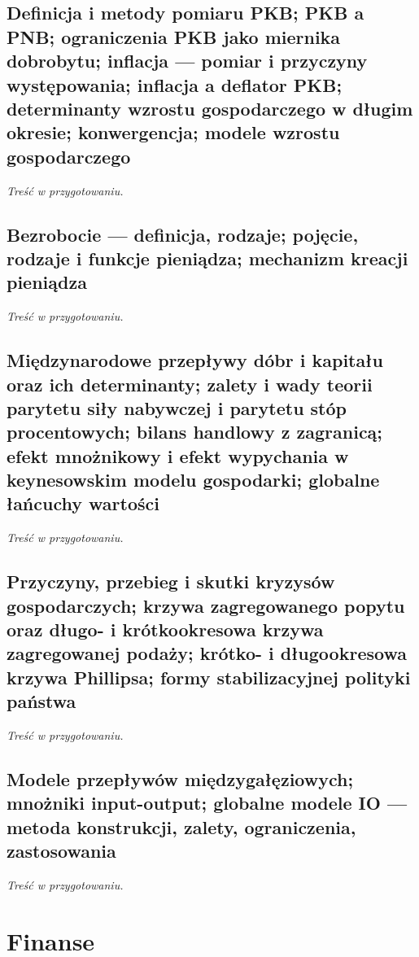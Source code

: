 \documentclass[12pt,a4paper]{report}
\begin{document}
\section[PKB, PNB, inflacja, wzrost gospodarczy, konwergencja]{Definicja i metody pomiaru PKB; PKB a PNB; ograniczenia PKB jako miernika dobrobytu; inflacja --- pomiar i przyczyny występowania; inflacja a deflator PKB; determinanty wzrostu gospodarczego w długim okresie; konwergencja; modele wzrostu gospodarczego}
\textit{Treść w przygotowaniu.}

\section[Bezrobocie; pieniądz i jego kreacja]{Bezrobocie --- definicja, rodzaje; pojęcie, rodzaje i funkcje pieniądza; mechanizm kreacji pieniądza}
\textit{Treść w przygotowaniu.}

\section[Handel i przepływy kapitału, parytety, model keynesowski]{Międzynarodowe przepływy dóbr i kapitału oraz ich determinanty; zalety i wady teorii parytetu siły nabywczej i parytetu stóp procentowych; bilans handlowy z zagranicą; efekt mnożnikowy i efekt wypychania w keynesowskim modelu gospodarki; globalne łańcuchy wartości}
\textit{Treść w przygotowaniu.}

\section[Kryzysy, AD--AS, krzywa Phillipsa, polityka stabilizacyjna]{Przyczyny, przebieg i skutki kryzysów gospodarczych; krzywa zagregowanego popytu oraz długo- i krótkookresowa krzywa zagregowanej podaży; krótko- i długookresowa krzywa Phillipsa; formy stabilizacyjnej polityki państwa}
\textit{Treść w przygotowaniu.}

\section[Modele przepływów międzygałęziowych (input--output)]{Modele przepływów międzygałęziowych; mnożniki input-output; globalne modele IO --- metoda konstrukcji, zalety, ograniczenia, zastosowania}
\textit{Treść w przygotowaniu.}

\chapter{Finanse}
\end{document}
